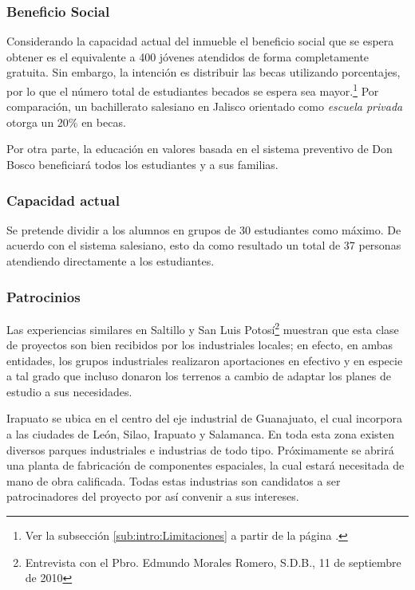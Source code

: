 
\subsubsection{Beneficio Social}
\label{sub:sub:Beneficio:Social}

Considerando la capacidad actual del inmueble el beneficio social que se espera obtener es el equivalente a 400 jóvenes atendidos de forma completamente gratuita. Sin embargo, la intención es distribuir las becas utilizando porcentajes, por lo que el número total de estudiantes becados se espera sea mayor.\footnote{Ver la subsección \ref{sub:intro:Limitaciones} a partir de la página \pageref{sub:intro:Limitaciones}.} Por comparación, un bachillerato salesiano en Jalisco orientado como \emph{escuela privada} otorga un 20\% en becas.

Por otra parte, la educación en valores basada en el sistema preventivo de Don Bosco beneficiará todos los estudiantes y a sus familias.

\subsubsection{Capacidad actual}

Se pretende dividir a los alumnos en grupos de 30 estudiantes como máximo. De acuerdo con el sistema salesiano, esto da como resultado un total de 37 personas atendiendo directamente a los estudiantes.


\subsubsection{Patrocinios}
\label{sub:Patrocinios}

Las experiencias similares en Saltillo y San Luis Potosí\footnote{Entrevista con el Pbro. Edmundo Morales Romero, S.D.B., 11 de septiembre de 2010} muestran que esta clase de proyectos son bien recibidos por los industriales locales; en efecto, en ambas entidades, los grupos industriales realizaron aportaciones en efectivo y en especie a tal grado que incluso donaron los terrenos a cambio de adaptar los planes de estudio a sus necesidades.

Irapuato se ubica en el centro del eje industrial de Guanajuato, el cual incorpora a las ciudades de León, Silao, Irapuato y Salamanca. En toda esta zona existen diversos parques industriales e industrias de todo tipo. Próximamente se abrirá una planta de fabricación de componentes espaciales, la cual estará necesitada de mano de obra calificada. Todas estas industrias son candidatos a ser patrocinadores del proyecto por así convenir a sus intereses.
